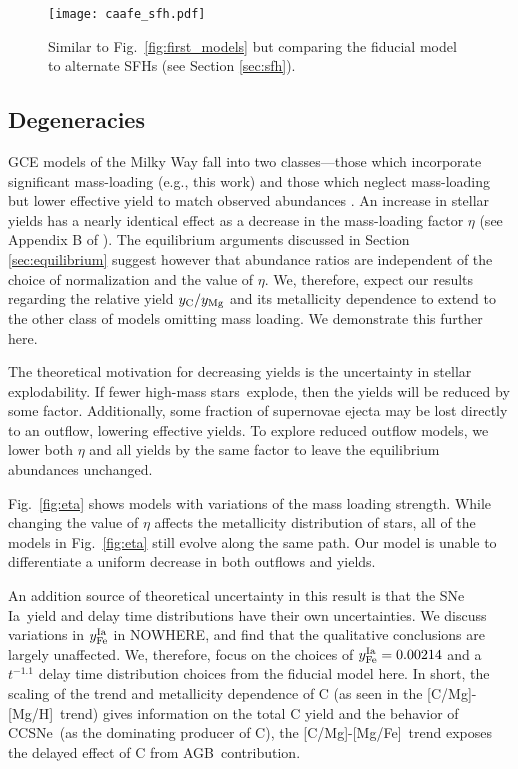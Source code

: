 \documentclass[fleqn,usenatbib]{mnras}
\newcommand{\agb}{AGB}
\newcommand{\cc}{CCSNe}
\newcommand{\gce}{GCE}
\newcommand{\ia}{SNe Ia}
\newcommand{\sfh}{SFH}
\newcommand{\hms}{high-mass stars}
\newcommand{\caah}{[C/Mg]-[Mg/H]}
\newcommand{\caafe}{[C/Mg]-[Mg/Fe]}
\begin{document}
\begin{figure}
\centering
\texttt{[image: caafe\_sfh.pdf]}

\caption{Similar to Fig.~\ref{fig:first_models} but comparing the fiducial model to alternate \sfh{}s (see Section  \ref{sec:sfh}).}

\label{fig:sfh_models}
\end{figure}

\subsection{Degeneracies} \label{sec:outflows}


\gce{} models of the Milky Way fall into two classes---those which incorporate significant mass-loading (e.g., this work) and those which neglect mass-loading but lower effective yield to match observed abundances \citep[e.g.][]{MCM13, MCM14, spitoni19, spitoni20, spitoni21}.
An increase in stellar yields has a nearly identical effect as a decrease in the mass-loading factor $\eta$ (see Appendix B of \citealt{james_dwarf}).
The equilibrium arguments discussed in Section \ref{sec:equilibrium} suggest however that abundance ratios are independent of the choice of normalization and the value of $\eta$. We, therefore, expect our results regarding the relative yield $y_{\rm C}/y_{\rm Mg}$ and its metallicity dependence to extend to the other class of models omitting mass loading. We demonstrate this further here.

The theoretical motivation for decreasing yields is the uncertainty in stellar explodability.
If fewer \hms\ explode, then the yields will be reduced by some factor. Additionally, some fraction of supernovae ejecta may be lost directly to an outflow, lowering effective yields. To explore reduced outflow models, we lower both $\eta$ and all yields by the same factor to leave the equilibrium abundances unchanged. 

Fig.~\ref{fig:eta} shows models with variations of the mass loading strength. While changing the value of $\eta$ affects the metallicity distribution of stars, all of the models in Fig.~\ref{fig:eta} still evolve along the same path. Our model is unable to differentiate a uniform decrease in both outflows and yields.

An addition source of theoretical uncertainty in this result is that the \ia\ yield and delay time distributions have their own uncertainties. We discuss variations in $y_{\rm Fe}^{\rm Ia}$ in NOWHERE, and find that the qualitative conclusions are largely unaffected. We, therefore, focus on the choices of $y_{\rm Fe}^{\rm Ia} = 0.00214$ and a $t^{-1.1}$ delay time distribution choices from the fiducial model here.
In short, the scaling of the trend and metallicity dependence of C (as seen in
the \caah\ trend) gives information on the total C yield and the behavior of \cc\ (as the dominating producer of C), the \caafe\ trend exposes the delayed effect of C from \agb\ contribution.
\end{document}
